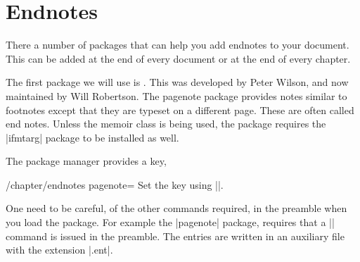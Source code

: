 \chapter{Endnotes}

There a number of packages that can help you add endnotes to your document.
This can be added at the end of every document or at the end of every chapter.

The first package we will use is . This was developed by Peter Wilson, 
and now maintained by Will Robertson. The pagenote package provides notes similar to footnotes except that
they are typeset on a different page. These are often called end notes.
Unless the memoir class is being used, the package requires the |ifmtarg|
package to be installed as well.

The package manager provides a key,


\begin{key}{/chapter/endnotes pagenote=  }
 Set the key using ||.
\end{key}

One need to be careful, of the other commands required, in the preamble when you load the package. For example the |pagenote| package, requires that a |\makepagenote| command is issued in the preamble.
The entries are written in an auxiliary file with the extension |.ent|. 



